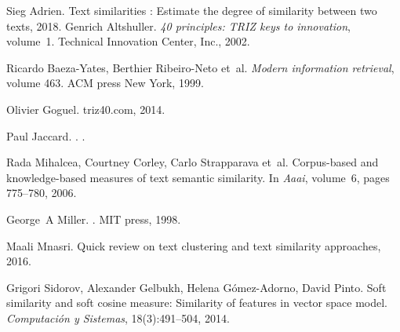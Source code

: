 \documentclass[11pt,a4paper]{article}
\begin{document}
\begin{thebibliography}{xx}

 Sieg Adrien.  \newblock Text similarities : Estimate
  the degree of similarity between two texts, 2018.
 Genrich Altshuller.  \emph{40 principles: TRIZ
  keys to innovation}, volume~1.  Technical Innovation Center, Inc., 2002.

 Ricardo Baeza-Yates, Berthier Ribeiro-Neto
  et~al. {\em Modern information retrieval}, volume 463.  ACM press New York,
  1999.

 Olivier Goguel.  \newblock triz40.com, 2014.

 Paul Jaccard.  .  .

 Rada Mihalcea, Courtney Corley, Carlo
  Strapparava et~al.  \newblock Corpus-based and knowledge-based measures of
  text semantic similarity.  \newblock In {\em Aaai}, volume~6, pages
  775--780, 2006.

 George~A Miller.  .  \newblock MIT press, 1998.

 Maali Mnasri.  \newblock Quick review on text
  clustering and text similarity approaches, 2016.

 Grigori Sidorov, Alexander Gelbukh, Helena
  G{\'o}mez-Adorno, David Pinto.  \newblock Soft similarity and soft
  cosine measure: Similarity of features in vector space model.  \newblock
  {\em Computaci{\'o}n y Sistemas}, 18(3):491--504, 2014.

\end{thebibliography}
\end{document}
